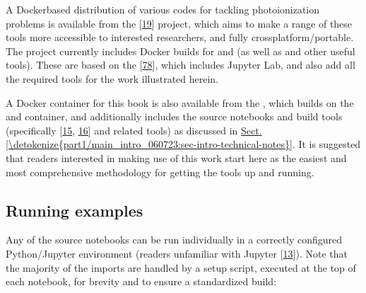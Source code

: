 \documentclass[letterpaper,table,10pt,english]{jupyterBook}
\begin{document}
\sphinxAtStartPar
A Docker\sphinxhyphen{}based distribution of various codes for tackling
photoionization problems is available from the  {[}\hyperlink{cite.backmatter/bibliography:id686}{19}{]}
project, which aims to make a range of these tools more accessible to
interested researchers, and fully cross\sphinxhyphen{}platform/portable. The project currently includes Docker builds for  and  (as well as  and other useful tools). These are based on the  {[}\hyperlink{cite.backmatter/bibliography:id712}{78}{]}, which includes Jupyter Lab, and also add all the required tools for the work illustrated herein.

\sphinxAtStartPar
A Docker container for this book is also available from the , which builds on the  and  container, and additionally includes the source notebooks and build tools (specifically  {[}\hyperlink{cite.backmatter/bibliography:id711}{15}, \hyperlink{cite.backmatter/bibliography:id565}{16}{]} and related tools) as discussed in  \hyperref[\detokenize{part1/main_intro_060723:sec-intro-technical-notes}]{Sect.\@ \ref{\detokenize{part1/main_intro_060723:sec-intro-technical-notes}}}. It is suggested that readers interested in making use of this work start here as the easiest \sphinxhyphen{} and most comprehensive \sphinxhyphen{} methodology for getting the tools up and running.


\subsection{Running examples}
\label{\detokenize{part1/platform_intro_070723:running-examples}}
\sphinxAtStartPar
Any of the source notebooks can be run individually in a correctly configured Python/Jupyter environment (readers unfamiliar with Jupyter  {[}\hyperlink{cite.backmatter/bibliography:id827}{13}{]}). Note that the majority of the imports are handled by a setup script, executed at the top of each notebook, for brevity and to ensure a standardized build:
\end{document}
